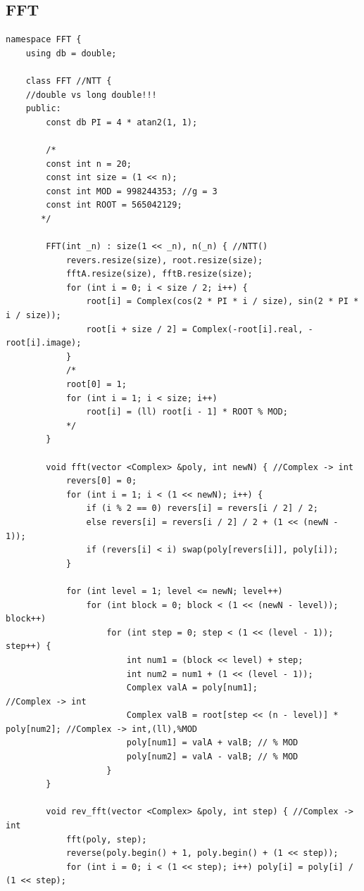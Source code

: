 \documentclass[10pt, portrait,letterpaper]{article}
\begin{document}
\subsection{FFT}

\begin{verbatim}
namespace FFT {
    using db = double;

    class FFT //NTT {
    //double vs long double!!!
    public:
        const db PI = 4 * atan2(1, 1);

        /*
        const int n = 20;
        const int size = (1 << n);
        const int MOD = 998244353; //g = 3
        const int ROOT = 565042129;
       */
        
        FFT(int _n) : size(1 << _n), n(_n) { //NTT()
            revers.resize(size), root.resize(size);
            fftA.resize(size), fftB.resize(size);
            for (int i = 0; i < size / 2; i++) {
                root[i] = Complex(cos(2 * PI * i / size), sin(2 * PI * i / size));
                root[i + size / 2] = Complex(-root[i].real, -root[i].image);
            }
            /*
            root[0] = 1;
            for (int i = 1; i < size; i++)
                root[i] = (ll) root[i - 1] * ROOT % MOD;
            */
        }

        void fft(vector <Complex> &poly, int newN) { //Complex -> int
            revers[0] = 0;
            for (int i = 1; i < (1 << newN); i++) {
                if (i % 2 == 0) revers[i] = revers[i / 2] / 2;
                else revers[i] = revers[i / 2] / 2 + (1 << (newN - 1));
                if (revers[i] < i) swap(poly[revers[i]], poly[i]);
            }

            for (int level = 1; level <= newN; level++)
                for (int block = 0; block < (1 << (newN - level)); block++)
                    for (int step = 0; step < (1 << (level - 1)); step++) {
                        int num1 = (block << level) + step;
                        int num2 = num1 + (1 << (level - 1));
                        Complex valA = poly[num1];                             //Complex -> int
                        Complex valB = root[step << (n - level)] * poly[num2]; //Complex -> int,(ll),%MOD
                        poly[num1] = valA + valB; // % MOD
                        poly[num2] = valA - valB; // % MOD
                    }
        }

        void rev_fft(vector <Complex> &poly, int step) { //Complex -> int
            fft(poly, step);
            reverse(poly.begin() + 1, poly.begin() + (1 << step));
            for (int i = 0; i < (1 << step); i++) poly[i] = poly[i] / (1 << step);


\end{verbatim}
\end{document}
